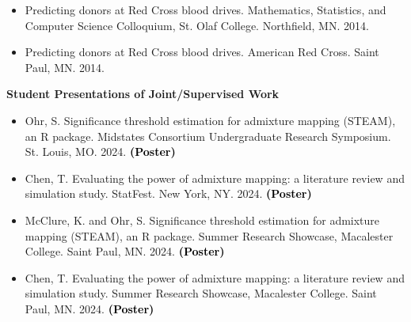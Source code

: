 \documentclass[margin]{res}
\newcommand{\annotate}[1]{\textcolor{black}{\textbf{(#1)}}}
\newcommand{\annotateItem}[1]{
	\begin{itemize} \vspace{-0.1cm}
	\item[] 
	\begin{footnotesize}\textcolor{black}{(#1)}\end{footnotesize}
	\end{itemize} \vspace{-0.1cm}
}
\begin{document}
\begin{resume}
\begin{itemize}
\item[2.] %
Predicting donors at Red Cross blood drives. 
Mathematics, Statistics, and Computer Science Colloquium, St. Olaf College. Northfield, MN. 2014.

\item[1.] %
Predicting donors at Red Cross blood drives. 
American Red Cross. Saint Paul, MN. 2014.%


\end{itemize}



\textbf{Student Presentations of Joint/Supervised Work}

\begin{itemize}


\item[11.] Ohr, S. 
Significance threshold estimation for admixture mapping (STEAM), an R package. 
Midstates Consortium Undergraduate Research Symposium. St. Louis, MO. 2024. 
\annotate{Poster}

\item[10.] Chen, T. 
Evaluating the power of admixture mapping: a literature review and simulation study. 
StatFest. New York, NY. 2024. 
\annotate{Poster}

\item[9.] McClure, K. and Ohr, S. 
Significance threshold estimation for admixture mapping (STEAM), an R package. 
Summer Research Showcase, Macalester College. Saint Paul, MN. 2024. 
\annotate{Poster}%

\item[8.] Chen, T. 
Evaluating the power of admixture mapping: a literature review and simulation study. 
Summer Research Showcase, Macalester College. Saint Paul, MN. 2024. 
\annotate{Poster}


\end{itemize}
\end{resume}
\end{document}
